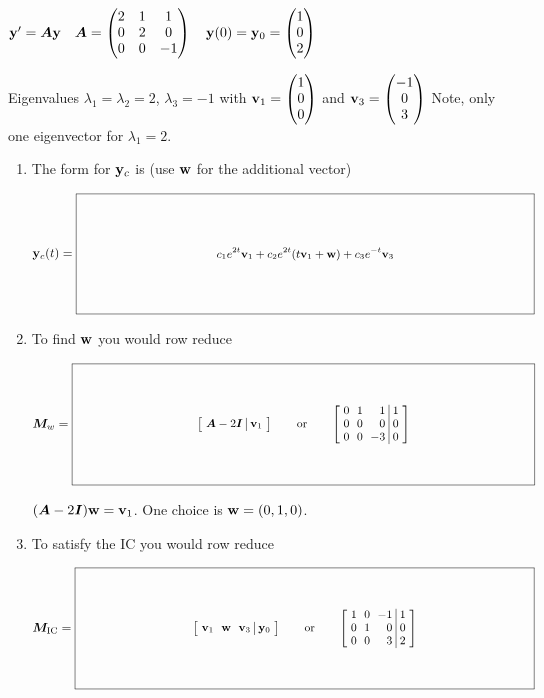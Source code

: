 \documentclass[12pt,letterpaper]{article}
\newcommand{\mat}[1]{\bm{#1}}
\newcommand{\VectorKey}[1]{\KeyBox{4.992in}{1.248in}{#1}}
\newcommand{\KeyBox}[3]{%
  \vcenter{\hbox{$\boxed{\parbox[c][#2][c]{#1}{\centering\small
    \setlength{\arraycolsep}{3pt}\renewcommand{\arraystretch}{0.95}%
    \ensuremath{\displaystyle #3}}}$}}}
\begin{document}
$\vect{y}'=\mat{A}\vect{y}\quad
\mat{A}=\begin{pmatrix}2&1&1\\0&2&0\\0&0&-1\end{pmatrix}\quad
\vect{y}(0)=\vect{y}_0=\begin{pmatrix}1\\0\\2\end{pmatrix}$
\par Eigenvalues $\lambda_1=\lambda_2=2$, $\lambda_3=-1$ with
$\vect{v}_1=\begin{pmatrix}1\\0\\0\end{pmatrix}$ and
$\vect{v}_3=\begin{pmatrix}-1\\0\\3\end{pmatrix}$\hfill
Note, only one eigenvector for $\lambda_1=2$.
\begin{enumerate}
\item The form for $\mathbf{y}_c$ is (use $\mathbf{w}$ for the additional vector)
\par $\vect{y}_c(t)=\VectorKey{c_1e^{2t}\vect{v}_1+c_2e^{2t}(t\vect{v}_1+\vect{w})+c_3e^{-t}\vect{v}_3}$
\vfill
\item To find $\mathbf{w}$ you would row reduce
\par $\mat{M}_w=\VectorKey{\left[\begin{array}{c|c}
\mat{A}-2\mat{I}&\vect{v}_1
\end{array}\right]\qquad\text{or}\qquad
\left[\begin{array}{rrr|r}
0&1&1&1\\0&0&0&0\\0&0&-3&0
\end{array}\right]}$
\par{\footnotesize $(\mat{A}-2\mat{I})\vect{w}=\vect{v}_1$. One choice is $\mathbf{w}=(0,1,0)$.} 
\vfill
\item To satisfy the IC you would row reduce
\par $\mat{M}_{\mathrm{IC}}=\VectorKey{\left[\begin{array}{ccc|c}
\vect{v}_1&\vect{w}&\vect{v}_3&\vect{y}_0
\end{array}\right]\qquad\text{or}\qquad
\left[\begin{array}{rrr|r}
1&0&-1&1\\0&1&0&0\\0&0&3&2
\end{array}\right]}$
\end{enumerate}
\end{document}

